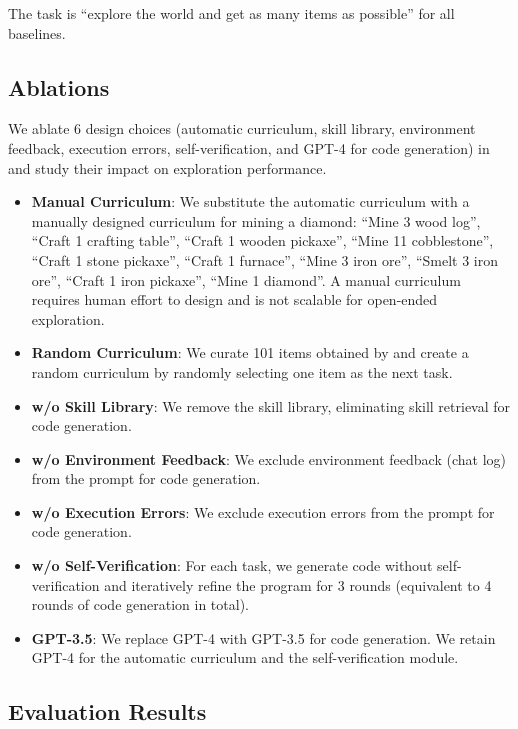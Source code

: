 The task is ``explore the world and get as many items as possible'' for all baselines.



\subsection{Ablations}
\label{supp:sec:ablations}
We ablate 6 design choices (automatic curriculum, skill library, environment feedback, execution errors, self-verification, and GPT-4 for code generation) in \voyager and study their impact on exploration performance.
\begin{itemize}
    \item \textbf{Manual Curriculum}: We substitute the automatic curriculum with a manually designed curriculum for mining a diamond: ``Mine 3 wood log'', ``Craft 1 crafting table'', ``Craft 1 wooden pickaxe'', ``Mine 11 cobblestone'', ``Craft 1 stone pickaxe'', ``Craft 1 furnace'', ``Mine 3 iron ore'', ``Smelt 3 iron ore'', ``Craft 1 iron pickaxe'', ``Mine 1 diamond''. A manual curriculum requires human effort to design and is not scalable for open-ended exploration.
    \item \textbf{Random Curriculum}: We curate 101 items obtained by \voyager and create a random curriculum by randomly selecting one item as the next task.
    \item \textbf{w/o Skill Library}: We remove the skill library, eliminating skill retrieval for code generation.
    \item \textbf{w/o Environment Feedback}: We exclude environment feedback (chat log) from the prompt for code generation.
    \item \textbf{w/o Execution Errors}: We exclude execution errors from the prompt for code generation.
    \item \textbf{w/o Self-Verification}: For each task, we generate code without self-verification and iteratively refine the program for 3 rounds (equivalent to 4 rounds of code generation in total).
    \item \textbf{GPT-3.5}: We replace GPT-4 with GPT-3.5 for code generation. We retain GPT-4 for the automatic curriculum and the self-verification module.
\end{itemize}

\subsection{Evaluation Results}
